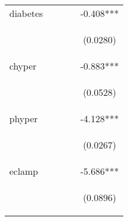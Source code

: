 \begin{table}[htpb!]
\begin{center}
{\begin{tabular}{lcccc}
diabetes &  &  &  & -0.408*** \\
\vspace{4pt} & \begin{footnotesize}\end{footnotesize} & \begin{footnotesize}\end{footnotesize} & \begin{footnotesize}\end{footnotesize} & \begin{footnotesize}(0.0280)\end{footnotesize} \\
chyper &  &  &  & -0.883*** \\
\vspace{4pt} & \begin{footnotesize}\end{footnotesize} & \begin{footnotesize}\end{footnotesize} & \begin{footnotesize}\end{footnotesize} & \begin{footnotesize}(0.0528)\end{footnotesize} \\
phyper &  &  &  & -4.128*** \\
\vspace{4pt} & \begin{footnotesize}\end{footnotesize} & \begin{footnotesize}\end{footnotesize} & \begin{footnotesize}\end{footnotesize} & \begin{footnotesize}(0.0267)\end{footnotesize} \\
eclamp &  &  &  & -5.686*** \\
\vspace{4pt} & \begin{footnotesize}\end{footnotesize} & \begin{footnotesize}\end{footnotesize} & \begin{footnotesize}\end{footnotesize} & \begin{footnotesize}(0.0896)\end{footnotesize} \\

\end{tabular}}
\end{center}
\end{table}

